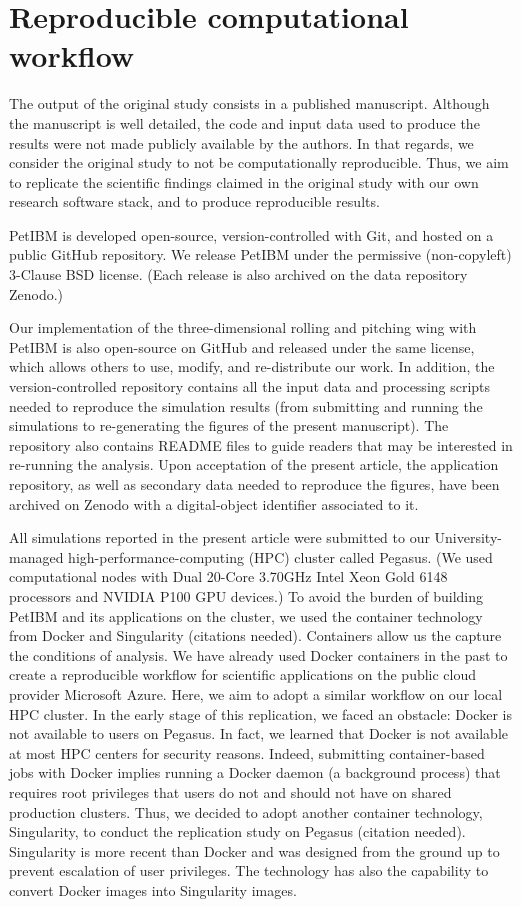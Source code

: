 \section{Reproducible computational workflow}

The output of the original study consists in a published manuscript.
Although the manuscript is well detailed, the code and input data used to produce the results were not made publicly available by the authors.
In that regards, we consider the original study to not be computationally reproducible.
Thus, we aim to replicate the scientific findings claimed in the original study with our own research software stack, and to produce reproducible results.

PetIBM\supercite{chuang_et_al_2018} is developed open-source, version-controlled with Git, and hosted on a public GitHub repository.
We release PetIBM under the permissive (non-copyleft) 3-Clause BSD license.
(Each release is also archived on the data repository Zenodo.)

Our implementation of the three-dimensional rolling and pitching wing with PetIBM is also open-source on GitHub and released under the same license, which allows others to use, modify, and re-distribute our work.
In addition, the version-controlled repository contains all the input data and processing scripts needed to reproduce the simulation results (from submitting and running the simulations to re-generating the figures of the present manuscript).
The repository also contains \textsc{README} files to guide readers that may be interested in re-running the analysis.
Upon acceptation of the present article, the application repository, as well as secondary data needed to reproduce the figures, have been archived on Zenodo with a digital-object identifier associated to it.

All simulations reported in the present article were submitted to our University-managed high-performance-computing (HPC) cluster called Pegasus.
(We used computational nodes with Dual 20-Core 3.70GHz Intel Xeon Gold 6148 processors and NVIDIA P100 GPU devices.)
To avoid the burden of building PetIBM and its applications on the cluster, we used the container technology from Docker and Singularity (citations needed).
Containers allow us the capture the conditions of analysis.
We have already used Docker containers in the past to create a reproducible workflow for scientific applications on the public cloud provider Microsoft Azure.\supercite{mesnard_barba_2020}
Here, we aim to adopt a similar workflow on our local HPC cluster.
In the early stage of this replication, we faced an obstacle: Docker is not available to users on Pegasus.
In fact, we learned that Docker is not available at most HPC centers for security reasons.
Indeed, submitting container-based jobs with Docker implies running a Docker daemon (a background process) that requires root privileges that users do not and should not have on shared production clusters.
Thus, we decided to adopt another container technology, Singularity, to conduct the replication study on Pegasus (citation needed).
Singularity is more recent than Docker and was designed from the ground up to prevent escalation of user privileges.
The technology has also the capability to convert Docker images into Singularity images.

